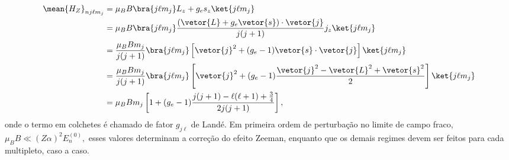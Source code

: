 \begin{align*}
   \mean{H_Z}_{nj\ell m_j} &= \mu_B B \bra{j\ell m_j}L_z + g_e s_z\ket{j\ell m_j}\\
                           &= \mu_B B \bra{j\ell m_j}\frac{(\vetor{L} + g_e \vetor{s})\cdot \vetor{j}}{j(j+1)} j_z \ket{j\ell m_j}\\
                           &= \frac{\mu_B B m_j}{j(j+1)} \bra{j\ell m_j}\left[\vetor{j}^2 +(g_e - 1) \vetor{s}\cdot \vetor{j}\right]\ket{j\ell m_j}\\
                           &= \frac{\mu_B B m_j}{j(j+1)} \bra{j\ell m_j}\left[\vetor{j}^2 +(g_e - 1) \frac{\vetor{j}^2 - \vetor{L}^2 + \vetor{s}^2}{2}\right]\ket{j\ell m_j}\\
                           &= \mu_B B m_j \left[1 + (g_e - 1)\frac{j(j+1) - \ell(\ell + 1) + \frac34}{2j(j+1)}\right],
\end{align*}
onde o termo em colchetes é chamado de fator \(g_{j\ell}\) de Landé. Em primeira ordem de perturbação no limite de campo fraco, \(\mu_B B \ll (Z \alpha)^2 E_n^{(0)},\) esses valores determinam a correção do efeito Zeeman, enquanto que os demais regimes devem ser feitos para cada multipleto, caso a caso.


